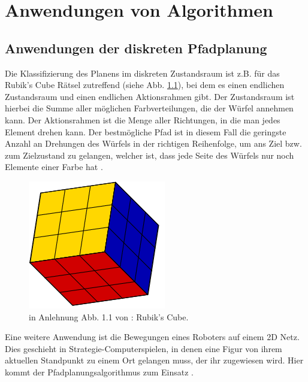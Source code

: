 
\chapter{Anwendungen von Algorithmen}\label{Kapitel4}
\section{Anwendungen der diskreten Pfadplanung}
Die Klassifizierung des Planens im  diskreten Zustandsraum ist z.B. für das Rubik's Cube Rätsel zutreffend (siehe Abb. \ref{Abb. 5.1}), bei dem es einen endlichen Zustandsraum und einen endlichen Aktionsrahmen gibt. Der Zustandsraum ist hierbei die Summe aller möglichen Farbverteilungen, die der Würfel annehmen kann. Der Aktionsrahmen ist die Menge aller Richtungen, in die man jedes Element drehen kann. Der bestmögliche Pfad ist in diesem Fall die geringste Anzahl an Drehungen des Würfels in der richtigen Reihenfolge, um ans Ziel bzw. zum Zielzustand zu gelangen, welcher ist, dass jede Seite des Würfels nur noch Elemente einer Farbe hat \cite[~S. 20]{Lav06}.\\
\begin{figure}
	\centering
	\includegraphics[width=0.4\linewidth]{images/img229}
	\caption{in Anlehnung Abb. 1.1 von \cite[~S. 5]{Lav06}: Rubik's Cube.}
	\label{Abb. 5.1}
\end{figure}%

Eine weitere Anwendung ist die Bewegungen eines Roboters auf einem 2D Netz. Dies geschieht in Strategie-Computerspielen, in denen eine Figur von ihrem aktuellen Standpunkt zu einem Ort gelangen muss, der ihr zugewiesen wird. Hier kommt der Pfadplanungsalgorithmus zum Einsatz \cite{cui2011based}.%

